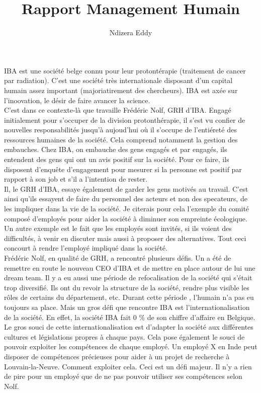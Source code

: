 \documentclass[12pt]{report}
\title{Rapport Management Humain}
\author{Ndizera Eddy}
\begin{document}
\maketitle

IBA est une société belge connu pour leur protontérapie (traitement de cancer par radiation). C'est une société très internationale disposant d'un capital humain assez important (majoriatirement des chercheurs). IBA est axée sur l'inoovation, le désir de faire avancer la science.\\

C'est dans ce contexte-là que travaille Frédéric Nolf, GRH d'IBA. Engagé initialement pour s'occuper de la division protonthérapie, il s'est vu confier de nouvelles responsabilités jusqu'à aujoud'hui où il s'occupe de l'entiéreté des ressources humaines de la société. Cela comprend notamment la gestion des embauches. Chez IBA, on embauche des gens engagés et par engagés, ils entendent des gens qui ont un avis positif sur la société. Pour ce faire, ils disposent d'enquête d'engagement pour mesurer si la personne est positif par rapport à son job et s'il a l'intention de rester.\\

Il, le GRH d'IBA, essaye également de garder les gens motivés au travail. C'est ainsi qu'ils essayent de faire du personnel des acteurs et non des specateurs, de les impliquer dans la vie de la société. Je citerais pour cela l'exemple du comité composé d'employés pour  aider la société à diminuer son empreinte écologique. Un autre exemple est le fait que les employés sont invités, si ils voient des difficultés, à venir en discuter mais aussi à proposer des alternatives. Tout ceci concourt à rendre l'employé impliqué dans la société. \\

Frédéric Nolf, en qualité de GRH, a rencontré plusieurs défis. Un a été de remettre en route le nouveau CEO d'IBA et de mettre en place autour de lui une dream team. Il y a eu aussi une période de refocalisation de la société qui s'était trop diversifié. Ils ont du revoir la structure de la société, rendre plus visible les rôles de certains du département, etc. Durant cette période , l'humain n'a pas eu toujours sa place. Mais un gros défi que rencontre IBA est l'internationalisation de la société. En effet, la société IBA fait 0 \% de son chiffre d'affaire en Belgique. Le gros souci de cette internationalisation est d'adapter la société aux différentes cultures et législations propres à chaque pays. Cela pose également le souci de pouvoir exploiter les compétences de chaque employé. Un employé X en Inde peut disposer de compétences précieuses pour aider à un projet de recherche à Louvain-la-Neuve. Comment exploiter cela. Ceci est un défi majeur. Il n'y a rien de pire pour un employé que de ne pas pouvoir utiliser ses compétences selon Nolf.\\
\end{document}
